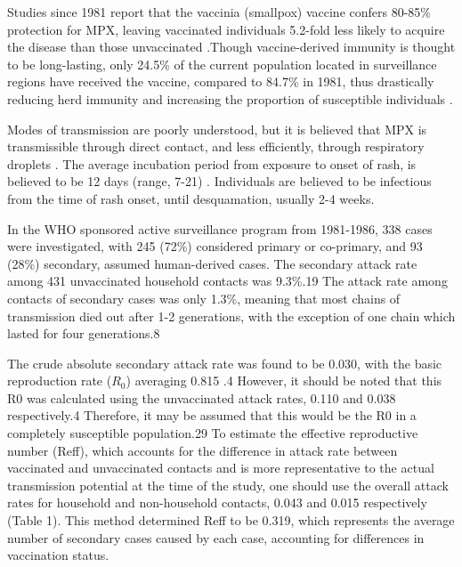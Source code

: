 Studies since 1981 report that the vaccinia (smallpox) vaccine confers 80-85\% protection for MPX, leaving vaccinated individuals 5.2-fold less likely to acquire the disease than those unvaccinated \cite{Fine1988, Rimoin2010}.Though vaccine-derived immunity is thought to be long-lasting, only 24.5\% of the current population located in surveillance regions have received the vaccine, compared to 84.7\% in 1981, thus drastically reducing herd immunity and increasing the proportion of susceptible individuals \cite{Rimoin2010, Jezek1988, Jezek1987}.

Modes of transmission are poorly understood, but it is believed that MPX is transmissible through direct contact, and less efficiently, through respiratory droplets \cite{DiGiulio2004}. The average incubation period from exposure to onset of rash, is believed to be 12 days (range, 7-21) \cite{Jezek1987, Hutin2001}. Individuals are believed to be infectious from the time of rash onset, until desquamation, usually 2-4 weeks. 

In the WHO sponsored active surveillance program from 1981-1986, 338 cases were investigated, with 245 (72\%) considered primary or co-primary, and 93 (28\%) secondary, assumed human-derived cases. The secondary attack rate among 431 unvaccinated household contacts was 9.3\%.19 The attack rate among contacts of secondary cases was only 1.3\%, meaning that most chains of transmission died out after 1-2 generations, with the exception of one chain which lasted for four generations.8 

The crude absolute  secondary attack rate was found to be 0.030, with the basic reproduction rate ($R_{0}$) averaging 0.815 \cite{Fine1988}.4 However, it should be noted that this R0 was calculated using the unvaccinated attack rates, 0.110 and 0.038 respectively.4 Therefore, it may be assumed that this would be the R0 in a completely susceptible population.29 To estimate the effective reproductive number (Reff), which accounts for the difference in attack rate between vaccinated and unvaccinated contacts and is more representative to the actual transmission potential at the time of the study, one should use the overall attack rates for household and non-household contacts, 0.043 and 0.015 respectively (Table 1). This method determined Reff to be 0.319, which represents the average number of secondary cases caused by each case, accounting for differences in vaccination status. 

